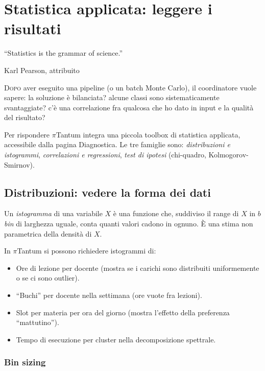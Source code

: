 \chapter{Statistica applicata: leggere i risultati}
\label{ch:metodo_statistica}

\epigraph{``Statistics is the grammar of science.''}{Karl Pearson,
attribuito}

\lettrine[lines=3]{D}{opo} aver eseguito una pipeline (o un
batch Monte Carlo), il coordinatore vuole sapere: la
soluzione \`e bilanciata? alcune classi sono
sistematicamente svantaggiate? c'\`e una correlazione fra
qualcosa che ho dato in input e la qualit\`a del risultato?

Per rispondere $\pi$Tantum integra una piccola toolbox di
statistica applicata, accessibile dalla pagina
Diagnostica. Le tre famiglie sono:
\emph{distribuzioni e istogrammi},
\emph{correlazioni e regressioni},
\emph{test di ipotesi} (chi-quadro, Kolmogorov-Smirnov).

\section{Distribuzioni: vedere la forma dei dati}

\begin{defbox}
Un \emph{istogramma} di una variabile
$X$ \`e una funzione che, suddiviso il range di $X$ in $b$
\emph{bin} di larghezza uguale, conta quanti valori cadono
in ognuno. \`E una stima non parametrica della densit\`a di
$X$.
\end{defbox}

In $\pi$Tantum si possono richiedere istogrammi di:
\begin{itemize}
\item Ore di lezione per docente (mostra se i carichi sono
  distribuiti uniformemente o se ci sono outlier).
\item ``Buchi'' per docente nella settimana (ore vuote fra
  lezioni).
\item Slot per materia per ora del giorno (mostra
  l'effetto della preferenza ``mattutino'').
\item Tempo di esecuzione per cluster nella decomposizione
  spettrale.
\end{itemize}

\subsection{Bin sizing}

